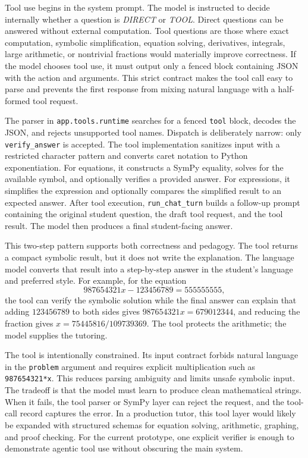 Tool use begins in the system prompt. The model is instructed to decide internally whether a question is \emph{DIRECT} or \emph{TOOL}. Direct questions can be answered without external computation. Tool questions are those where exact computation, symbolic simplification, equation solving, derivatives, integrals, large arithmetic, or nontrivial fractions would materially improve correctness. If the model chooses tool use, it must output only a fenced block containing JSON with the action and arguments. This strict contract makes the tool call easy to parse and prevents the first response from mixing natural language with a half-formed tool request.

The parser in \texttt{app.tools.runtime} searches for a fenced \texttt{tool} block, decodes the JSON, and rejects unsupported tool names. Dispatch is deliberately narrow: only \texttt{verify\_answer} is accepted. The tool implementation sanitizes input with a restricted character pattern and converts caret notation to Python exponentiation. For equations, it constructs a SymPy equality, solves for the available symbol, and optionally verifies a provided answer. For expressions, it simplifies the expression and optionally compares the simplified result to an expected answer. After tool execution, \texttt{run\_chat\_turn} builds a follow-up prompt containing the original student question, the draft tool request, and the tool result. The model then produces a final student-facing answer.

This two-step pattern supports both correctness and pedagogy. The tool returns a compact symbolic result, but it does not write the explanation. The language model converts that result into a step-by-step answer in the student's language and preferred style. For example, for the equation
\[
987654321x - 123456789 = 555555555,
\]
the tool can verify the symbolic solution while the final answer can explain that adding $123456789$ to both sides gives $987654321x=679012344$, and reducing the fraction gives $x=75445816/109739369$. The tool protects the arithmetic; the model supplies the tutoring.

The tool is intentionally constrained. Its input contract forbids natural language in the \texttt{problem} argument and requires explicit multiplication such as \texttt{987654321*x}. This reduces parsing ambiguity and limits unsafe symbolic input. The tradeoff is that the model must learn to produce clean mathematical strings. When it fails, the tool parser or SymPy layer can reject the request, and the tool-call record captures the error. In a production tutor, this tool layer would likely be expanded with structured schemas for equation solving, arithmetic, graphing, and proof checking. For the current prototype, one explicit verifier is enough to demonstrate agentic tool use without obscuring the main system.

